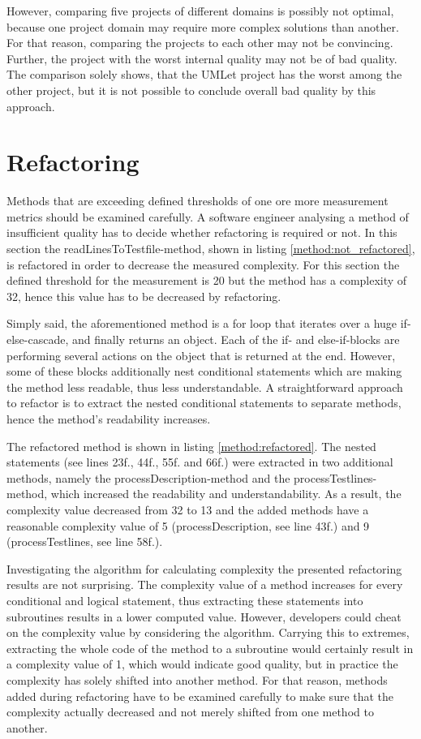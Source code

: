 \documentclass[conference]{IEEEtran}
\newcommand{\lref}[1]{listing \ref{#1}}%
\begin{document}
However, comparing five projects of different domains is possibly not optimal, because one project domain may require more complex solutions than another. For that reason, comparing the projects to each other may not be convincing. Further, the project with the worst internal quality may not be of bad quality. The comparison solely shows, that the UMLet project has the worst among the other project, but it is not possible to conclude overall bad quality by this approach. 

\section{Refactoring}
\label{sec:refactoring}
Methods that are exceeding defined thresholds of one ore more measurement metrics should be examined carefully. A software engineer analysing a method of insufficient quality has to decide whether refactoring is required or not. In this section the readLinesToTestfile-method, shown in \lref{method:not_refactored}, is refactored in order to decrease the measured complexity. For this section the defined threshold for the measurement is 20 but the method has a complexity of 32, hence this value has to be decreased by refactoring.

Simply said, the aforementioned method is a for loop that iterates over a huge if-else-cascade, and finally returns an object. Each of the if- and else-if-blocks are performing several actions on the object that is returned at the end. However, some of these blocks additionally nest conditional statements which are making the method less readable, thus less understandable. A straightforward approach to refactor is to extract the nested conditional statements to separate methods, hence the method's readability increases. 

The refactored method is shown in \lref{method:refactored}. The nested statements (see lines 23f., 44f., 55f. and 66f.) were extracted in two additional methods, namely the processDescription-method and the processTestlines-method, which increased the readability and understandability. As a result, the complexity value decreased from 32 to 13 and the added methods have a reasonable complexity value of 5 (processDescription, see line 43f.) and 9 (processTestlines, see line 58f.). 

Investigating the algorithm for calculating complexity the presented refactoring results are not surprising. The complexity value of a method increases for every conditional and logical statement, thus extracting these statements into subroutines results in a lower computed value. However, developers could cheat on the complexity value by considering the algorithm. Carrying this to extremes, extracting the whole code of the method to a subroutine would certainly result in a complexity value of 1, which would indicate good quality, but in practice the complexity has solely shifted into another method. For that reason, methods added during refactoring have to be examined carefully to make sure that the complexity actually decreased and not merely shifted from one method to another.
\end{document}
